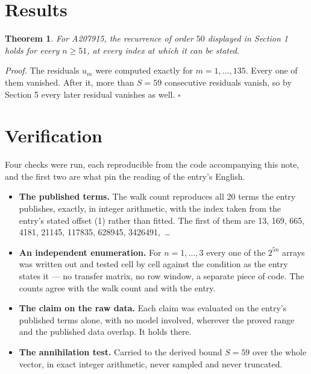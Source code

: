 \documentclass[11pt]{article}
\newtheorem{theorem}{Theorem}
\theoremstyle{definition}
\begin{document}
\section{Results}

\begin{theorem} For A207915, the recurrence of order $50$ displayed in Section 1 holds for every $n \ge 51$, at every index at which it can be stated.\end{theorem}

{\itshape Proof.} The residuals $u_m$ were computed exactly for $m = 1,\dots,135$. Every one of them vanished. After it, more than $S = 59$ consecutive residuals vanish, so by Section 5 every later residual vanishes as well. $\square$

\section{Verification}

Four checks were run, each reproducible from the code accompanying this note, and the first two are what pin the reading of the entry's English.

\begin{itemize}

\item {\bfseries The published terms.} The walk count reproduces all 20 terms the entry publishes, exactly, in integer arithmetic, with the index taken from the entry's stated offset (1) rather than fitted. The first of them are 13, 169, 665, 4181, 21145, 117835, 628945, 3426491,~\dots

\item {\bfseries An independent enumeration.} For $n = 1,\dots,3$ every one of the $2^{5n}$ arrays was written out and tested cell by cell against the condition as the entry states it --- no transfer matrix, no row window, a separate piece of code. The counts agree with the walk count and with the entry.

\item {\bfseries The claim on the raw data.} Each claim was evaluated on the entry's published terms alone, with no model involved, wherever the proved range and the published data overlap. It holds there.

\item {\bfseries The annihilation test.} Carried to the derived bound $S = 59$ over the whole vector, in exact integer arithmetic, never sampled and never truncated.

\end{itemize}
\end{document}
